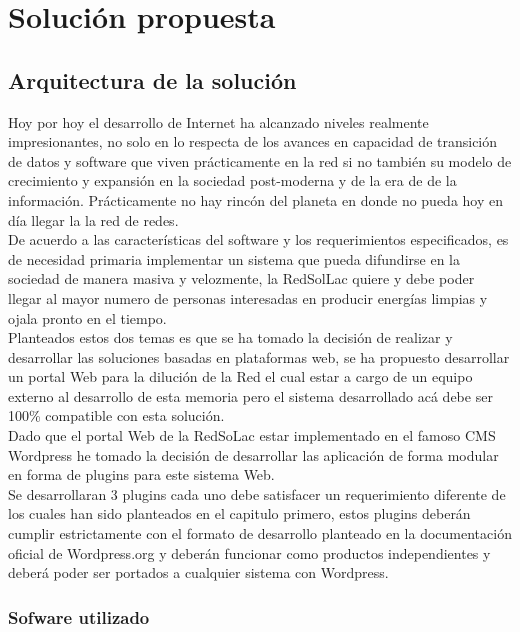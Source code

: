 \chapter{Solución propuesta}
\label{solucion}
\section{Arquitectura de la solución}
Hoy por hoy el desarrollo de Internet ha alcanzado niveles realmente impresionantes, no solo en lo respecta de los avances en capacidad de transición de datos y software que viven prácticamente en la red si no también su modelo de crecimiento y expansión en la sociedad post-moderna y de la era de de la información. Prácticamente no hay rincón del planeta en donde no pueda hoy en día llegar la la red de redes.\\
De acuerdo a las características del software y los requerimientos especificados, es de necesidad primaria implementar un sistema que pueda difundirse en la sociedad de manera masiva y velozmente, la RedSolLac quiere y debe poder llegar al mayor numero de personas interesadas en producir energías limpias y ojala pronto en el tiempo.\\
Planteados estos dos temas es que se ha tomado la decisión de realizar y desarrollar las soluciones basadas en plataformas web, se ha propuesto desarrollar un portal Web para la dilución de la Red el cual estar a cargo de un equipo externo al desarrollo de esta memoria pero el sistema desarrollado acá debe ser 100\% compatible con esta solución.\\
Dado que el portal Web de la RedSoLac estar implementado en el famoso CMS Wordpress he tomado la decisión de desarrollar las aplicación de forma modular en forma de plugins para este sistema Web.\\
Se desarrollaran 3 plugins cada uno debe satisfacer un requerimiento diferente de los cuales han sido planteados en el capitulo primero, estos plugins deberán cumplir estrictamente con el formato de desarrollo planteado en la documentación oficial de Wordpress.org y deberán funcionar como productos independientes y deberá poder ser portados a cualquier sistema con Wordpress.\\

\subsection{Sofware utilizado}
